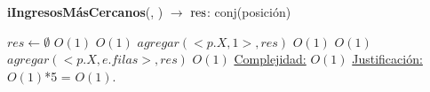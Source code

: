 \begin{Algoritmos}
\begin{algorithm}[H]{\textbf{iIngresosM\'asCercanos}(, ) $\to$ $\res$: conj(posici\'on)}
	\begin{algorithmic}
    	\State $res \gets \emptyset$	\Comment $O(1)$
       		\Comment $O(1)$
        	\State $agregar(<p.X,1>,res)$	\Comment $O(1)$
        \EndIf
        	\Comment $O(1)$
        	\State $agregar(<p.X,e.filas>,res)$	\Comment $O(1)$
        \EndIf
	\Statex \underline{Complejidad:} $O(1)$
	\Statex \underline{Justificación:} $O(1)$*5 = $O(1)$.        
	\end{algorithmic}
\end{algorithm}
  
\end{Algoritmos}